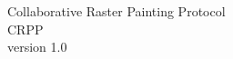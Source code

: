 \documentclass[12pt,oneside,a4paper]{report}
\begin{document}
\thispagestyle{empty}
\begin{center}

{\Huge Collaborative Raster Painting Protocol}\\[50pt]

{\Huge CRPP}\\[100pt]

{\Large version 1.0}

\end{center}
\newpage

\tableofcontents
\newpage









\end{document}
